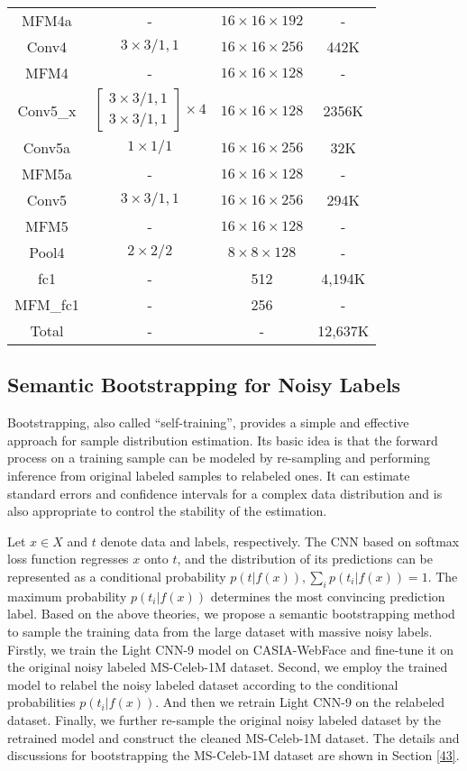 \documentclass[journal,transmag]{IEEEtran}
\begin{document}
\begin{table}[t]
\begin{tabular}{|c|c|c|c|}
MFM4a & - & $16\times 16 \times 192$ & - \\
Conv4 & $3 \times 3/1, 1$ & $16\times 16 \times 256$ & 442K\\
MFM4 & - & $16\times 16 \times 128$ & - \\
\hline
Conv5\_x & $\left[\begin{array}{c}3\times3/1,1\\ 3\times3/1,1\end{array}\right]\times 4$ & $16\times 16 \times 128$& 2356K\\
Conv5a & $1 \times 1/1$ & $16\times 16 \times 256$ & 32K\\
MFM5a & - & $16\times 16 \times 128$ & - \\
Conv5 & $3 \times 3/1, 1$ & $16\times 16 \times 256$ & 294K\\
MFM5 & - & $16\times 16 \times 128$ & - \\
\hline
Pool4 & $2 \times 2/2$ & $8\times 8 \times 128$ & -\\
\hline
fc1 & - & 512 & 4,194K \\
MFM\_fc1 & - & 256 & - \\
\hline
Total & - & - & 12,637K\\
\hline
\end{tabular}
\label{tab:network_29layer}
\end{table}

\subsection{Semantic Bootstrapping for Noisy Labels}

Bootstrapping, also called ``self-training'', provides a simple and effective approach for sample distribution estimation. Its basic idea is that the forward process on a training sample can be modeled by re-sampling and performing inference from original labeled samples to relabeled ones. It can estimate standard errors and confidence intervals for a complex data distribution and is also appropriate to control the stability of the estimation.

Let $x\in X$ and $t$ denote data and labels, respectively. The CNN based on softmax loss function regresses $x$ onto $t$, and the distribution of its predictions can be represented as a conditional probability $p(t|f(x)), \sum_ip(t_i|f(x))=1$. The maximum probability $p(t_i|f(x))$ determines the most convincing prediction label.
Based on the above theories, we propose a semantic bootstrapping method to sample the training data from the large dataset with massive noisy labels. Firstly, we train the Light CNN-9 model on CASIA-WebFace and fine-tune it on the original noisy labeled MS-Celeb-1M dataset. Second, we employ the trained model to relabel the noisy labeled dataset according to the conditional probabilities $p(t_i|f(x))$. And then we retrain Light CNN-9 on the relabeled dataset. Finally, we further re-sample the original noisy labeled dataset by the retrained model and construct the cleaned MS-Celeb-1M dataset.  The details and discussions for bootstrapping the MS-Celeb-1M dataset are shown in Section \ref{43}.
\end{document}
